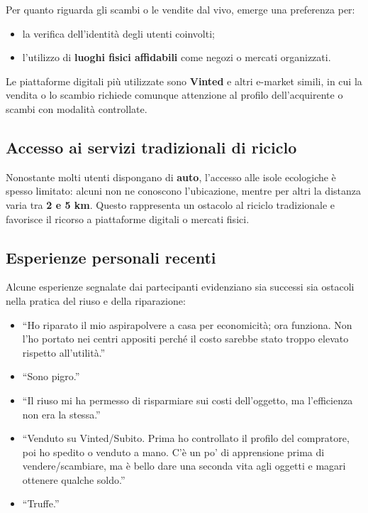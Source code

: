 \documentclass[12pt,a4paper]{article}
\begin{document}
Per quanto riguarda gli scambi o le vendite dal vivo, emerge una preferenza per:  
\begin{itemize}
    \item la verifica dell’identità degli utenti coinvolti;  
    \item l’utilizzo di \textbf{luoghi fisici affidabili} come negozi o mercati organizzati.  
\end{itemize}

Le piattaforme digitali più utilizzate sono \textbf{Vinted} e altri e-market simili, in cui la vendita o lo scambio richiede comunque attenzione al profilo dell’acquirente o scambi con modalità controllate.  

\subsection{Accesso ai servizi tradizionali di riciclo}

Nonostante molti utenti dispongano di \textbf{auto}, l’accesso alle isole ecologiche è spesso limitato: alcuni non ne conoscono l’ubicazione, mentre per altri la distanza varia tra \textbf{2 e 5 km}. Questo rappresenta un ostacolo al riciclo tradizionale e favorisce il ricorso a piattaforme digitali o mercati fisici.  

\subsection{Esperienze personali recenti}

Alcune esperienze segnalate dai partecipanti evidenziano sia successi sia ostacoli nella pratica del riuso e della riparazione:  

\begin{itemize}
    \item ``Ho riparato il mio aspirapolvere a casa per economicità; ora funziona. Non l'ho portato nei centri appositi perché il costo sarebbe stato troppo elevato rispetto all'utilità.''  
    \item ``Sono pigro.''  
    \item ``Il riuso mi ha permesso di risparmiare sui costi dell'oggetto, ma l’efficienza non era la stessa.''  
    \item ``Venduto su Vinted/Subito. Prima ho controllato il profilo del compratore, poi ho spedito o venduto a mano. C'è un po' di apprensione prima di vendere/scambiare, ma è bello dare una seconda vita agli oggetti e magari ottenere qualche soldo.''  
    \item ``Truffe.''  
\end{itemize}
\end{document}
